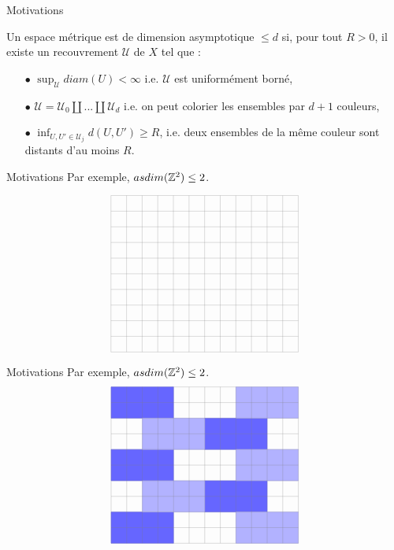 \begin{frame}{Motivations}

\begin{definitionfr}
Un espace métrique est de dimension asymptotique $\leq d$ si, pour tout $R>0$, il existe un recouvrement $\mathcal U$ de $X$  tel que :
\vspace{0.3 cm}
\begin{itemize}
\item[$\bullet$] $\sup_{\mathcal U} diam(U)<\infty$ i.e. $\mathcal U$ est uniformément borné,
\vspace{0.3 cm}
\item[$\bullet$] $\mathcal U = \mathcal U_0 \coprod ... \coprod \mathcal U_d$ i.e. on peut colorier les ensembles par $d+1$ couleurs,
\vspace{0.3 cm}
\item[$\bullet$] $\inf_{U,U'\in\mathcal U_j} d(U,U')\geq R$, i.e. deux ensembles de la même couleur sont distants d'au moins $R$.
 \end{itemize}
\end{definitionfr}
\end{frame}

\begin{frame}{Motivations}
Par exemple, $asdim(\mathbb Z^2) \leq 2$.

\[\begin{tikzpicture}
\draw [very thin, gray] (0,0) grid[step=0.5] (6,5);
\end{tikzpicture}\]
\end{frame}


\begin{frame}{Motivations}
Par exemple, $asdim(\mathbb Z^2) \leq 2$.
\[\begin{tikzpicture}

\draw[fill, blue!60] (0,0) rectangle (2,1) ; 
\draw[fill, blue!60] (0,2) rectangle (2,3) ; 
\draw[fill, blue!60] (0,4) rectangle (2,5) ; 
\draw[fill, blue!60] (3,1) rectangle (5,2) ;
\draw[fill, blue!60] (3,3) rectangle (5,4) ; 

\draw[fill, blue!30] (4,0) rectangle (6,1) ; 
\draw[fill, blue!30] (4,2) rectangle (6,3) ; 
\draw[fill, blue!30] (4,4) rectangle (6,5) ; 
\draw[fill, blue!30] (1,1) rectangle (3,2) ; 
\draw[fill, blue!30] (1,3) rectangle (3,4) ; 

\draw [very thin, gray] (0,0) grid[step=0.5] (6,5);
\end{tikzpicture}\]
\end{frame}

